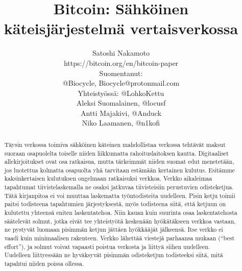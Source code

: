 \documentclass{article}
\begin{document}
\title{Bitcoin: Sähköinen käteisjärjestelmä vertaisverkossa}
\author[1]{\small{Satoshi Nakamoto \\\vspace{-3mm} https://bitcoin.org/en/bitcoin-paper} \\
\vspace{0mm}
\footnotesize{Suomentanut: \\ @Biocycle, Biocycle@protonmail.com \\
Yhteistyössä: @LohkoKettu \\ Aleksi Suomalainen, @locusf \\ Antti Majakivi, @Anduck \\ Niko Laamanen, @n1kofi}}
\date{}
\maketitle

\begin{abstract}
Täysin verkossa toimiva sähköinen käteinen mahdollistaa verkossa tehtävät maksut suoraan osapuolelta toiselle niiden liikkumatta rahoituslaitoksen kautta. Digitaaliset allekirjoitukset ovat osa ratkaisua, mutta tär\-keim\-mät niiden suomat edut menetetään, jos luotettua kolmatta osapuolta yhä tarvitaan estämään kertainen kulutus. Esitämme kaksinkertaisen kulutuksen ongelmaan ratkaisuksi verkkoa. Verkko aikaleimaa tapahtumat tiivistelaskemalla ne osaksi jatkuvaa tiivisteisiin perustuvien odisteketjua. Tätä kirjanpitoa ei voi muuttaa laskematta työntodisteita uudelleen. Pisin ketju toimii paitsi todisteena tapahtumien järjestyksestä, myös todisteena siitä, että ketjuun on kulutettu yhteensä eniten laskentatehoa. Niin kauan kuin suurinta osaa laskentatehosta säätelevät solmut, jotka eivät tee yhteistyötä keskenään hyökätäkseen verkkoa vastaan, ne pystyvät luomaan pisimmän ketjun jättäen hyökkääjät jälkeensä. Itse verkko ei vaadi kuin minimaalisen rakenteen. Verkko lä\-het\-tää  viestejä parhaansa mukaan (“best effort”), ja solmut voivat vapaasti poistua verkosta ja liittyä siihen uudelleen. Uudelleen liittyessään ne hy\-väk\-sy\-vät  pisimmän odisteketjun todisteeksi siitä, mitä tapahtui niiden poissa ollessa.

\end{abstract}
\end{document}
